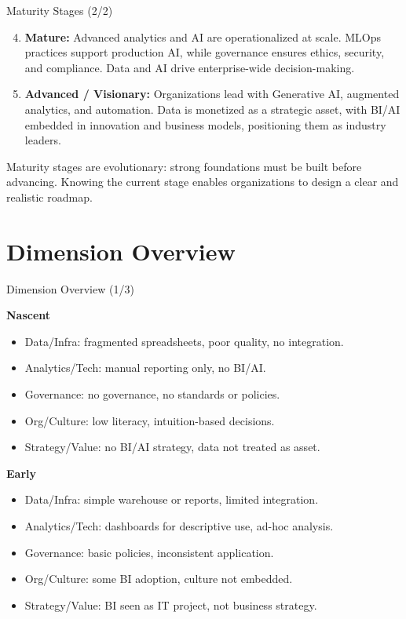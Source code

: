 \documentclass[aspectratio=169, table]{beamer}
\begin{document}
\begin{frame}{Maturity Stages (2/2)}
	\vspace{20pt}
	
	\begin{enumerate}
		\setcounter{enumi}{3} %
		\item \textbf{Mature:} Advanced analytics and AI are operationalized at scale.  
		MLOps practices support production AI, while governance ensures ethics, 
		security, and compliance. Data and AI drive enterprise-wide decision-making.  
		
		\item \textbf{Advanced / Visionary:} Organizations lead with Generative AI, 
		augmented analytics, and automation.  
		Data is monetized as a strategic asset, with BI/AI embedded in innovation 
		and business models, positioning them as industry leaders.  
	\end{enumerate}
	
	Maturity stages are evolutionary: strong foundations must be built before advancing.  
	Knowing the current stage enables organizations to design a clear and realistic roadmap.  
	
\end{frame}

\section{Dimension Overview }

\begin{frame}{Dimension Overview (1/3)}
	\vspace{20pt}
	
	\textbf{Nascent}
	\begin{itemize}
		\item Data/Infra: fragmented spreadsheets, poor quality, no integration.
		\item Analytics/Tech: manual reporting only, no BI/AI.
		\item Governance: no governance, no standards or policies.
		\item Org/Culture: low literacy, intuition-based decisions.
		\item Strategy/Value: no BI/AI strategy, data not treated as asset.
	\end{itemize}
	
	\textbf{Early}
	\begin{itemize}
		\item Data/Infra: simple warehouse or reports, limited integration.
		\item Analytics/Tech: dashboards for descriptive use, ad-hoc analysis.
		\item Governance: basic policies, inconsistent application.
		\item Org/Culture: some BI adoption, culture not embedded.
		\item Strategy/Value: BI seen as IT project, not business strategy.
	\end{itemize}
	
\end{frame}
\end{document}
